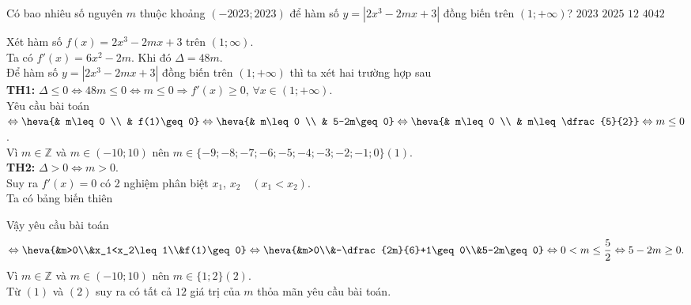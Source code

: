 \begin{ex}%
Có bao nhiêu số nguyên $m$ thuộc khoảng $(-2023;2023)$ để hàm số $y=\left|2x^3-2m x+3\right|$ đồng biến trên $(1;+\infty)$?
\choice
{$2023$}
{$2025$}
{\True $12$}
{$4042$}
\loigiai
{
Xét hàm số $f(x)=2x^3-2mx+3$ trên $(1;\infty)$.\\
Ta có $f'(x)=6x^2-2m$. Khi đó $\Delta=48m$.\\
Để hàm số $y=|2x^3-2mx+3|$ đồng biến trên $(1;+\infty)$ thì ta xét hai trường hợp sau\\
\textbf{TH1:} $\Delta\leq 0\Leftrightarrow 48m\leq 0\Leftrightarrow m\leq 0\Rightarrow f'(x)\geq 0$, $\forall x\in(1;+\infty)$.\\
Yêu cầu bài toán $\Leftrightarrow\heva{& m\leq 0 \\ & f(1)\geq 0}\Leftrightarrow\heva{& m\leq 0 \\ & 5-2m\geq 0}\Leftrightarrow\heva{& m\leq 0 \\ & m\leq \dfrac{5}{2}}\Leftrightarrow m\leq 0$.\\
Vì $m\in\mathbb{Z}$ và $m\in(-10;10)$ nên $m\in\{-9;-8;-7;-6;-5;-4;-3;-2;-1;0\}$\quad$(1)$.\\
\textbf{TH2:} $\Delta>0\Leftrightarrow m>0$.\\
Suy ra $f'(x)=0$ có 2 nghiệm phân biệt $x_1$, $x_2\quad\left(x_1<x_2\right)$.\\
Ta có bảng biến thiên
\begin{center}
\end{center}
Vậy yêu cầu bài toán
\[\Leftrightarrow\heva{&m>0\\&x_1<x_2\leq 1\\&f(1)\geq 0}\Leftrightarrow\heva{&m>0\\&-\dfrac{2m}{6}+1\geq 0\\&5-2m\geq 0}\Leftrightarrow  0<m\leq\dfrac{5}{2}\Leftrightarrow 5-2m\geq 0.\]
Vì $m\in\mathbb{Z}$ và $m\in(-10;10)$ nên $m\in\{1;2\}$\quad$(2)$.\\
Từ $(1)$ và $(2)$ suy ra có tất cả $12$ giá trị của $m$ thỏa mãn yêu cầu bài toán.
}
\end{ex}

